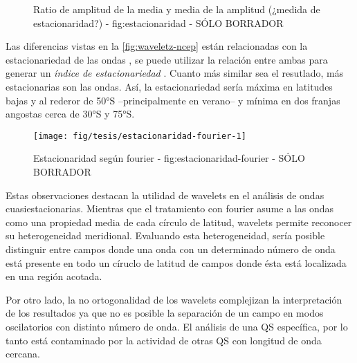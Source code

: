 \documentclass[spanish,a4paper]{book}
\begin{document}
\begin{figure}
\newline{}\caption{Ratio de amplitud de la media y media de la amplitud (¿medida de estacionaridad?) - fig:estacionaridad - SÓLO BORRADOR}\label{fig:estacionaridad}
\end{figure}

Las diferencias vistas en la \autoref{fig:waveletz-ncep} están
relacionadas con la estacionariedad de las ondas
,
se puede utilizar la relación entre ambas para generar un \emph{índice
de estacionariedad} . Cuanto más
similar sea el resutlado, más estacionarias son las ondas. Así, la
estacionariedad sería máxima en latitudes bajas y al rederor de 50°S
--principalmente en verano-- y mínima en dos franjas angostas cerca de
30°S y 75°S. 

\begin{figure}
\texttt{[image: fig/tesis/estacionaridad-fourier-1]} \caption{Estacionaridad según fourier - fig:estacionaridad-fourier - SÓLO BORRADOR}\label{fig:estacionaridad-fourier}
\end{figure}

Estas observaciones destacan la utilidad de wavelets en el análisis de
ondas cuasiestacionarias. Mientras que el tratamiento con fourier asume
a las ondas como una propiedad media de cada círculo de latitud,
wavelets permite reconocer su heterogeneidad meridional. Evaluando esta
heterogeneidad, sería posible distinguir entre campos donde una onda con
un determinado número de onda está presente en todo un círuclo de
latitud de campos donde ésta está localizada en una región acotada.

Por otro lado, la no ortogonalidad de los wavelets complejizan la
interpretación de los resultados ya que no es posible la separación de
un campo en modos oscilatorios con distinto número de onda. El análisis
de una QS específica, por lo tanto está contaminado por la actividad de
otras QS con longitud de onda cercana.
\end{document}
